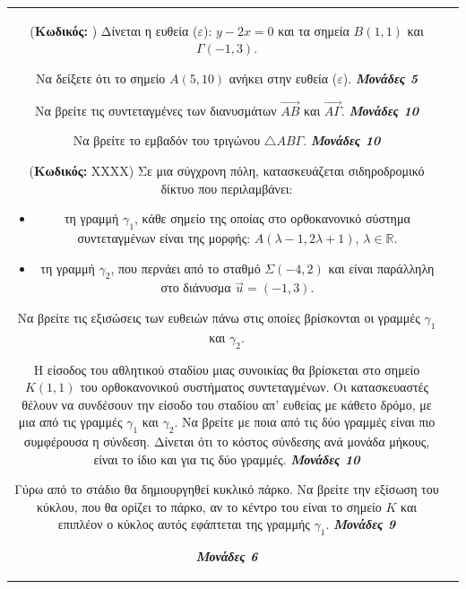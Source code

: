 \documentclass[11pt,a4paper,twoside]{book}
\newcounter{askhsh}[chapter]
\renewcommand{\theaskhsh}{
	\bf{\titlefont{\Large{\thechapter}}.\arabic{askhsh}}
}
\newcommand{\Askhsh}[2]{\refstepcounter{askhsh}{\vspace{4mm}\titlefont{{\large Άσκηση}\theaskhsh} - \textcolor{maincolor}{ΘEMA #2}} ({\small{\textbf{Κωδικός:} #1}})}{}
\newcommand{\monades}[1]{
\hspace*{\fill}
\textbf{\textit{\textcolor{maincolor}{Μονάδες #1}}}}
\begin{document}
\begin{tabular}{cc}
\vspace{4mm}

\Askhsh{}{2}
Δίνεται η ευθεία ($\varepsilon$): $y - 2x = 0$ και τα σημεία $B(1,1)$ και $\Gamma(-1,3)$.
\begin{alist}    \item Να δείξετε ότι το σημείο $A(5,10)$ ανήκει στην ευθεία ($\varepsilon$). \monades{5}
    \item Να βρείτε τις συντεταγμένες των διανυσμάτων $\vec{AB}$ και $\vec{A\Gamma}$. \monades{10}
    \item Να βρείτε το εμβαδόν του τριγώνου $\triangle AB\Gamma$. \monades{10}\end{alist}

\vspace{4mm}

\Askhsh{XXXX}{4}
Σε μια σύγχρονη πόλη, κατασκευάζεται σιδηροδρομικό δίκτυο που περιλαμβάνει:
\begin{itemize}
    \item τη γραμμή $γ_1$, κάθε σημείο της οποίας στο ορθοκανονικό σύστημα συντεταγμένων είναι της μορφής: $Α (\lambda-1, 2\lambda+1)$, $\lambda \in \mathbb{R}$.
    \item τη γραμμή $γ_2$, που περνάει από το σταθμό $Σ (-4, 2)$ και είναι παράλληλη στο διάνυσμα $\vec{u} = (-1, 3)$.
\end{itemize}

\begin{alist}    \item Να βρείτε τις εξισώσεις των ευθειών πάνω στις οποίες βρίσκονται οι γραμμές $γ_1$ και $γ_2$.
    \item Η είσοδος του αθλητικού σταδίου μιας συνοικίας θα βρίσκεται στο σημείο $K(1, 1)$ του ορθοκανονικού συστήματος συντεταγμένων. Οι κατασκευαστές θέλουν να συνδέσουν την είσοδο του σταδίου απ' ευθείας με κάθετο δρόμο, με μια από τις γραμμές $γ_1$ και $γ_2$. Να βρείτε με ποια από τις δύο γραμμές είναι πιο συμφέρουσα η σύνδεση. Δίνεται ότι το κόστος σύνδεσης ανά μονάδα μήκους, είναι το ίδιο και για τις δύο γραμμές.  \monades{10}
    \item Γύρω από το στάδιο θα δημιουργηθεί κυκλικό πάρκο. Να βρείτε την εξίσωση του κύκλου, που θα ορίζει το πάρκο, αν το κέντρο του είναι το σημείο $K$ και επιπλέον ο κύκλος αυτός εφάπτεται της γραμμής $γ_1$.  \monades{9}
 \monades{6}\end{alist}

\vspace{4mm}


\end{tabular}
\end{document}
